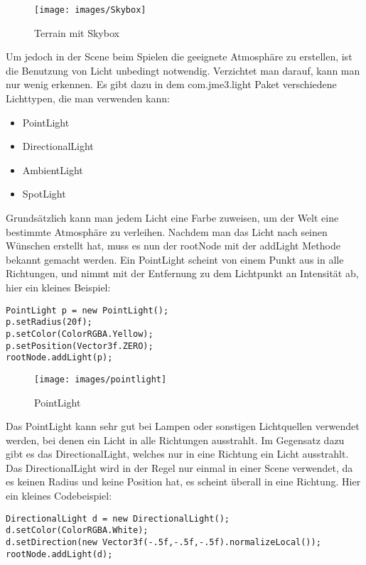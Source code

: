 \begin{figure}[h!]
		\caption{Terrain mit Skybox}
		
		\centering\texttt{[image: images/Skybox]} 
		
\end{figure} 
\newpage



Um jedoch in der Scene beim Spielen die geeignete Atmosphäre zu erstellen, ist die Benutzung von Licht unbedingt notwendig. Verzichtet man darauf, kann man nur wenig erkennen. Es gibt dazu in dem com.jme3.light Paket verschiedene Lichttypen, die man verwenden kann:
\begin{itemize}
	\item PointLight
	\item DirectionalLight
	\item AmbientLight
	\item SpotLight
\end{itemize}

Grundsätzlich kann man jedem Licht eine Farbe zuweisen, um der Welt eine bestimmte Atmosphäre zu verleihen. Nachdem man das Licht nach seinen Wünschen erstellt hat, muss es nun der rootNode mit der addLight Methode bekannt gemacht werden. Ein PointLight scheint von einem Punkt aus in alle Richtungen, und nimmt mit der Entfernung zu dem Lichtpunkt an Intensität ab, hier ein kleines Beispiel:
\begin{lstlisting}
PointLight p = new PointLight();
p.setRadius(20f);
p.setColor(ColorRGBA.Yellow);
p.setPosition(Vector3f.ZERO);
rootNode.addLight(p);
\end{lstlisting}

\begin{figure}[h!]
	
	
	\caption{PointLight}
	
	\centering\texttt{[image: images/pointlight]} 
	
\end{figure}

Das PointLight kann sehr gut bei Lampen oder sonstigen Lichtquellen verwendet werden, bei denen ein Licht in alle Richtungen ausstrahlt. Im Gegensatz dazu gibt es das DirectionalLight, welches nur in eine Richtung ein Licht ausstrahlt. Das DirectionalLight wird in der Regel nur einmal in einer Scene verwendet, da es keinen Radius und keine Position hat, es scheint überall in eine Richtung. Hier ein kleines Codebeispiel:
\begin{lstlisting}
DirectionalLight d = new DirectionalLight();
d.setColor(ColorRGBA.White);
d.setDirection(new Vector3f(-.5f,-.5f,-.5f).normalizeLocal());
rootNode.addLight(d);
\end{lstlisting}

